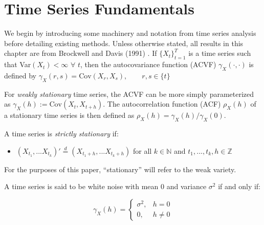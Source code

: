 \section{Time Series Fundamentals}




We begin by introducing some machinery and notation from time series analysis before detailing existing methods. Unless otherwise stated, all results in this chapter are from Brockwell and Davis (1991) \citep{BrockwellDavis1991}. If $\{X_t\}_{t=1}^T$ is a time series such that Var$(X_t) < \infty$ $\forall$ $t$, then the autocovariance function (ACVF) $\gamma_X(\cdot,\cdot)$ is defined by $\gamma_X(r,s) = \text{Cov}(X_r,X_s), \qquad r,s \in \{t\}$ 






For \emph{weakly stationary} time series, the ACVF can be more simply parameterized as $\gamma_X(h):= \text{Cov}(X_t,X_{t+h})$. The autocorrelation function (ACF) $\rho_X(h)$ of a stationary time series is then defined as $\rho_X(h) = \gamma_X(h)/\gamma_X(0)$.


A time series is \emph{strictly stationary} if:


\begin{itemize}
    \item[] $(X_{t_1},...X_{t_k})' \overset{d}{=} (X_{t_1 + h},...X_{t_k + h})$ for all $k \in \mathbb{N}$ and $t_1,...,t_k,h \in \mathbb{Z}$
\end{itemize}

For the purposes of this paper, ``stationary'' will refer to the weak variety. 
 

A time series is said to be white noise with mean $0$ and variance $\sigma^2$ if and only if:

\begin{equation}
    \label{eq:wn}
    \gamma_X(h) = \begin{cases}
        \sigma^2, & h = 0 \\
        0, & h \neq 0
    \end{cases}
\end{equation}





